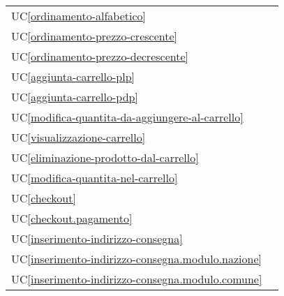\begin{longtable}{C{6cm} C{6cm}}
    UC\ref{ordinamento-alfabetico} &  \\

	UC\ref{ordinamento-prezzo-crescente} &  \\

    UC\ref{ordinamento-prezzo-decrescente} &  \\

	UC\ref{aggiunta-carrello-plp} &  \\

    UC\ref{aggiunta-carrello-pdp} &  \\

	UC\ref{modifica-quantita-da-aggiungere-al-carrello} &  \\

    UC\ref{visualizzazione-carrello} &  \newline {} \\

    UC\ref{eliminazione-prodotto-dal-carrello} &  \\

	UC\ref{modifica-quantita-nel-carrello} &  \\

    UC\ref{checkout} &  \\

    UC\ref{checkout.pagamento} &  \\

    UC\ref{inserimento-indirizzo-consegna} &  \\

	UC\ref{inserimento-indirizzo-consegna.modulo.nazione} &  \\

    UC\ref{inserimento-indirizzo-consegna.modulo.comune} &  \\


\end{longtable}
